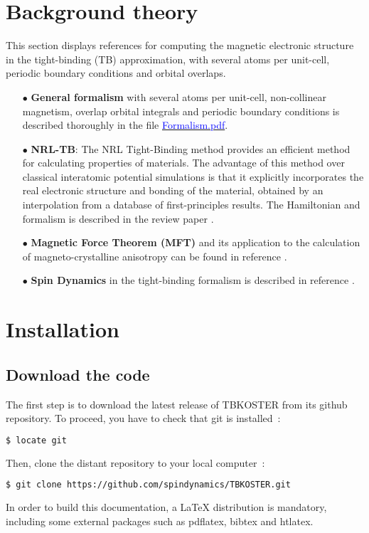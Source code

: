 \documentclass[12pt, onecolumn]{memoir}
\begin{document}
\mainmatter

\chapter{Background theory}

This section displays references for computing the magnetic electronic structure in the tight-binding (TB) approximation, with several atoms per unit-cell, periodic boundary conditions and orbital overlaps.

\begin{itemize}
  \item[$\bullet$]{\textbf{General formalism} with several atoms per unit-cell, non-collinear magnetism, overlap orbital integrals and periodic boundary conditions is described thoroughly in the file \href{https://fr.overleaf.com/read/hvmmbjspmtcg#e8c298}{\textcolor{blue}{Formalism.pdf}}.}
  \item[$\bullet$]{\textbf{NRL-TB}: The NRL Tight-Binding method provides an efficient method for calculating properties of materials. The advantage of this method over classical interatomic potential simulations is that it explicitly incorporates the real electronic structure and bonding of the material, obtained by an interpolation from a database of first-principles results. The Hamiltonian and formalism is described in the review paper \cite{barreteauEfficientMagneticTightbinding2016}.} 
  \item[$\bullet$]{\textbf{Magnetic Force Theorem (MFT)} and its application to the calculation of magneto-crystalline anisotropy can be found in reference \cite{liMagnetocrystallineAnisotropyEnergy2013}.
  }
  \item[$\bullet$]{\textbf{Spin Dynamics} in the tight-binding formalism is described in reference \cite{cardiasSpinDynamicsConstrained2021}.
  } 
\end{itemize}
\vfil

\chapter{Installation}

\section{Download the code}

The first step is to download the latest release of TBKOSTER from its github repository. To proceed, you have to check that git is installed~:
\begin{lstlisting}[language=bash,basicstyle=\small\ttfamily]
$ locate git
\end{lstlisting}
Then, clone the distant repository to your local computer~:
\begin{lstlisting}[language=bash,basicstyle=\small\ttfamily]
$ git clone https://github.com/spindynamics/TBKOSTER.git
\end{lstlisting}
In order to build this documentation, a LaTeX distribution is mandatory, including some external packages such as pdflatex, bibtex and htlatex.
\end{document}
